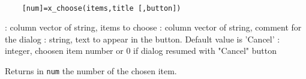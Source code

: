 
\begin{mandesc}
  \\ %
\end{mandesc}
\begin{calling_sequence}
  \begin{verbatim}
    [num]=x_choose(items,title [,button])   
  \end{verbatim}
\end{calling_sequence}
\begin{parameters}
  \begin{varlist}
    : column vector of string,  items to choose
    : column vector of string, comment for the dialog
    :  string, text to appear in the button. Default value is 'Cancel'
    : integer, choosen item number or 0 if dialog resumed with "Cancel" button
  \end{varlist}
\end{parameters}
\begin{mandescription}
  Returns in \verb!num! the number of the chosen item.
\end{mandescription}

\begin{examples}
  \begin{program}
  \end{program}
\end{examples}
\begin{manseealso}
\end{manseealso}

